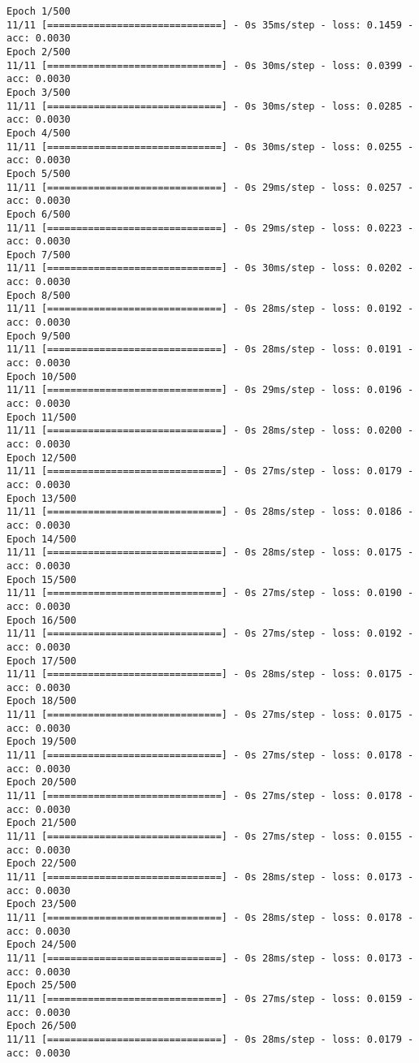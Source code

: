 \documentclass[11pt]{article}
\begin{document}
    \begin{Verbatim}[commandchars=\\\{\}]
Epoch 1/500
11/11 [==============================] - 0s 35ms/step - loss: 0.1459 - acc: 0.0030
Epoch 2/500
11/11 [==============================] - 0s 30ms/step - loss: 0.0399 - acc: 0.0030
Epoch 3/500
11/11 [==============================] - 0s 30ms/step - loss: 0.0285 - acc: 0.0030
Epoch 4/500
11/11 [==============================] - 0s 30ms/step - loss: 0.0255 - acc: 0.0030
Epoch 5/500
11/11 [==============================] - 0s 29ms/step - loss: 0.0257 - acc: 0.0030
Epoch 6/500
11/11 [==============================] - 0s 29ms/step - loss: 0.0223 - acc: 0.0030
Epoch 7/500
11/11 [==============================] - 0s 30ms/step - loss: 0.0202 - acc: 0.0030
Epoch 8/500
11/11 [==============================] - 0s 28ms/step - loss: 0.0192 - acc: 0.0030
Epoch 9/500
11/11 [==============================] - 0s 28ms/step - loss: 0.0191 - acc: 0.0030
Epoch 10/500
11/11 [==============================] - 0s 29ms/step - loss: 0.0196 - acc: 0.0030
Epoch 11/500
11/11 [==============================] - 0s 28ms/step - loss: 0.0200 - acc: 0.0030
Epoch 12/500
11/11 [==============================] - 0s 27ms/step - loss: 0.0179 - acc: 0.0030
Epoch 13/500
11/11 [==============================] - 0s 28ms/step - loss: 0.0186 - acc: 0.0030
Epoch 14/500
11/11 [==============================] - 0s 28ms/step - loss: 0.0175 - acc: 0.0030
Epoch 15/500
11/11 [==============================] - 0s 27ms/step - loss: 0.0190 - acc: 0.0030
Epoch 16/500
11/11 [==============================] - 0s 27ms/step - loss: 0.0192 - acc: 0.0030
Epoch 17/500
11/11 [==============================] - 0s 28ms/step - loss: 0.0175 - acc: 0.0030
Epoch 18/500
11/11 [==============================] - 0s 27ms/step - loss: 0.0175 - acc: 0.0030
Epoch 19/500
11/11 [==============================] - 0s 27ms/step - loss: 0.0178 - acc: 0.0030
Epoch 20/500
11/11 [==============================] - 0s 27ms/step - loss: 0.0178 - acc: 0.0030
Epoch 21/500
11/11 [==============================] - 0s 27ms/step - loss: 0.0155 - acc: 0.0030
Epoch 22/500
11/11 [==============================] - 0s 28ms/step - loss: 0.0173 - acc: 0.0030
Epoch 23/500
11/11 [==============================] - 0s 28ms/step - loss: 0.0178 - acc: 0.0030
Epoch 24/500
11/11 [==============================] - 0s 28ms/step - loss: 0.0173 - acc: 0.0030
Epoch 25/500
11/11 [==============================] - 0s 27ms/step - loss: 0.0159 - acc: 0.0030
Epoch 26/500
11/11 [==============================] - 0s 28ms/step - loss: 0.0179 - acc: 0.0030

\end{Verbatim}
\end{document}
